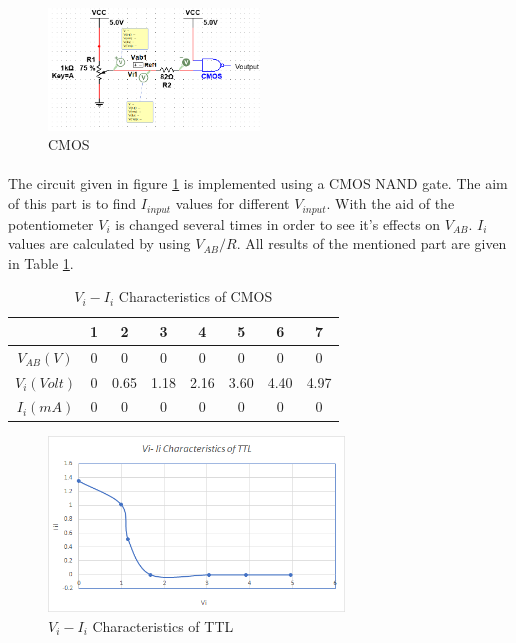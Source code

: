 \documentclass[pdftex,12pt,a4paper]{article}
\begin{document}
\begin{flushleft}
 \begin{figure}[h]
    	\centering
    	\includegraphics[width=0.5\textwidth]{part1d-cmos.png}
    	\caption{CMOS}
    	\label{fig:4-part1d-cmos}
\end{figure}

\paragraph{}The circuit given in figure \ref{fig:4-part1d-cmos} is implemented using a CMOS NAND gate. The aim of this part is to find $I_{input}$ values for different $V_{input}$. With the aid of the potentiometer $V_{i}$ is changed several times in order to see it's effects on $V_{AB}$. $I_{i}$ values are calculated by using $V_{AB}/R$. All results of the mentioned part are given in Table \ref{part1d-cmos}.

\begin{table}[h]
\begin{tabular}{c|c|c|c|c|c|c|c|}
               & 1 & 2    & 3    & 4    & 5    & 6    & 7    \\ \hline
$V_{AB} (V)$   & 0 & 0    & 0    & 0    & 0    & 0    & 0    \\ \hline
$V_{i} (Volt)$ & 0 & 0.65 & 1.18 & 2.16 & 3.60 & 4.40 & 4.97 \\ \hline
$I_{i} (mA)$   & 0 & 0    & 0    & 0    & 0    & 0    & 0   
\end{tabular}
\centering
\caption{$V_{i} - I_{i}$ Characteristics of CMOS}
\label{part1d-cmos}
\end{table}
\end{flushleft}


\newpage
 \begin{figure}[!h]
    	\centering
    	\includegraphics[width=0.7\textwidth]{charts/part1d-ttl-chart.png}	
    	\caption{$V_{i} - I_{i}$ Characteristics of TTL}
    	\label{graph:3-part1d-ttl}
\end{figure}
\end{document}
